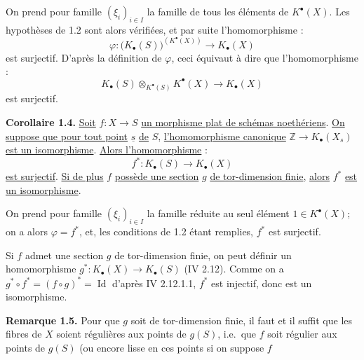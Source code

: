 
On
prend pour famille $(\xi_i)_{i\in I}$ la famille de tous les éléments de $K^{\bullet}(X)$. Les hypothèses de 1.2 sont alors vérifiées, et par suite l'homomorphisme :
\[
\varphi:\bigl(K_\bullet(S)\bigr)^{(K^{\bullet}(X))}\longrightarrow K_\bullet(X)
\]
est surjectif. D'après la définition de $\varphi$, ceci équivaut à dire que l'homomorphisme :
\[
K_\bullet(S)\otimes_{K^{\bullet}(S)}K^{\bullet}(X)\longrightarrow K_\bullet(X)
\]
est surjectif.

\textbf{Corollaire 1.4.} \uline{Soit} $f:X\to S$ \uline{un morphisme plat de schémas noethériens}. \uline{On suppose que pour tout point} $\underline{s}$ \uline{de} $S$, \uline{l'homomorphisme canonique} $\mathbb Z\to K_\bullet(X_s)$ \uline{est un isomorphisme}. \uline{Alors l'homomorphisme} :
\[
f^*:K_\bullet(S)\longrightarrow K_\bullet(X)
\]
\uline{est surjectif}. \uline{Si de plus} $f$ \uline{possède une section} $g$ \uline{de tor-dimension finie}, \uline{alors} $f^*$ \uline{est un isomorphisme}.

On prend pour famille $(\xi_i)_{i\in I}$ la famille réduite au seul élément $1\in K^{\bullet}(X)$; on a alors $\varphi=f^*$, et, les conditions de 1.2 étant remplies, $f^*$ est surjectif.

Si $f$ admet une section $g$ de tor-dimension finie, on peut définir un homomorphisme $g^*:K_\bullet(X)\to K_\bullet(S)$ (IV 2.12). Comme on a $g^*\circ f^*=(f\circ g)^*=\operatorname{Id}$ d'après IV 2.12.1.1, $f^*$ est injectif, donc est un isomorphisme.

\textbf{Remarque 1.5.} Pour que $g$ soit de tor-dimension finie, il faut et il suffit que les fibres de $X$ soient régulières aux points de $g(S)$, i.e.\ que $f$ soit régulier aux points de $g(S)$ (ou encore lisse en ces points si on suppose $f$

